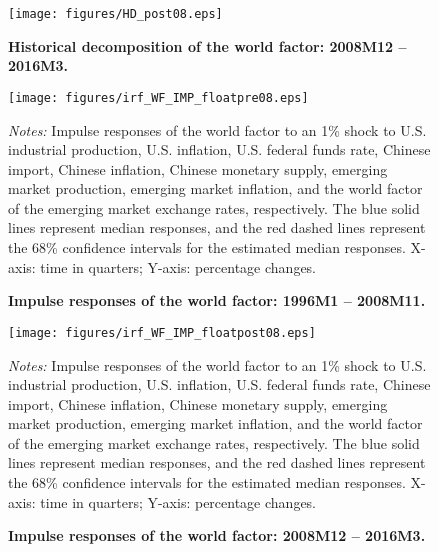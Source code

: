 \documentclass[12pt]{article}
\numberwithin{equation}{section}
\begin{document}
\begin{figure}
\centering
\caption{\textbf{Historical decomposition of the world factor: 2008M12 -- 2016M3.}}
\texttt{[image: figures/HD\_post08.eps]}

\label{fig:HD_WF_after1}
\end{figure}
\clearpage
%
%
%
\newpage
\begin{figure}
\centering
\caption{\textbf{Impulse responses of the world factor: 1996M1 -- 2008M11. }}
\texttt{[image: figures/irf\_WF\_IMP\_floatpre08.eps]}\label{fig:IRF_WF_IMP_before1}

\begin{minipage}{1\linewidth}
		\footnotesize
	\emph{Notes:} Impulse responses of the world factor to an  1\%  shock to U.S. industrial production, U.S. inflation, U.S. federal funds rate, Chinese import, Chinese inflation, Chinese monetary supply, emerging market production, emerging market inflation, and the world factor of the emerging market exchange rates, respectively. The blue solid lines represent median responses, and the red dashed lines represent the 68\% confidence intervals for the estimated median responses. X-axis:  time in quarters; Y-axis:  percentage changes.
\end{minipage}
\end{figure}
\newpage

\begin{figure}
\centering
\caption{\textbf{Impulse responses of the world factor: 2008M12 -- 2016M3.}}
\texttt{[image: figures/irf\_WF\_IMP\_floatpost08.eps]}

\label{fig:IRF_WF_IMP_after1}
\begin{minipage}{1\linewidth}
		\footnotesize
	\emph{Notes:} Impulse responses of the world factor to an  1\%  shock to U.S. industrial production, U.S. inflation, U.S. federal funds rate, Chinese import, Chinese inflation, Chinese monetary supply, emerging market production, emerging market inflation, and the world factor of the emerging market exchange rates, respectively. The blue solid lines represent median responses, and the red dashed lines represent the 68\% confidence intervals for the estimated median responses. X-axis:  time in quarters; Y-axis:  percentage changes.
\end{minipage}
\end{figure}
\end{document}
